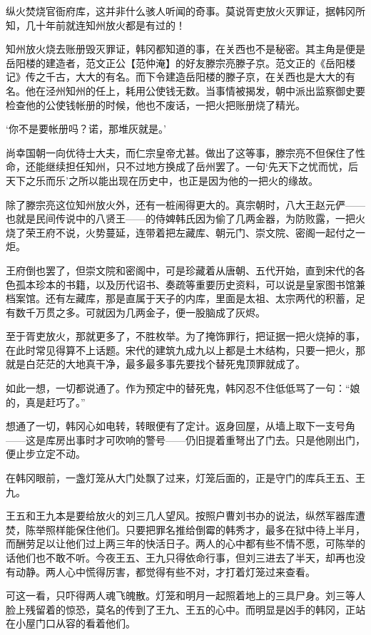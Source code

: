 纵火焚烧官衙府库，这并非什么骇人听闻的奇事。莫说胥吏放火灭罪证，据韩冈所知，几十年前就连知州放火都是有过的！

知州放火烧去账册毁灭罪证，韩冈都知道的事，在关西也不是秘密。其主角是便是岳阳楼的建造者，范文正公【范仲淹】的好友滕宗亮滕子京。范文正的《岳阳楼记》传之千古，大大的有名。而下令建造岳阳楼的滕子京，在关西也是大大的有名。他在泾州知州的任上，耗用公使钱无数。当事情被揭发，朝中派出监察御史要检查他的公使钱帐册的时候，他也不废话，一把火把账册烧了精光。

‘你不是要帐册吗？诺，那堆灰就是。’

尚幸国朝一向优待士大夫，而仁宗皇帝尤甚。做出了这等事，滕宗亮不但保住了性命，还能继续担任知州，只不过地方换成了岳州罢了。一句‘先天下之忧而忧，后天下之乐而乐’之所以能出现在历史中，也正是因为他的一把火的缘故。

除了滕宗亮这位知州放火外，还有一桩闹得更大的。真宗朝时，八大王赵元俨——也就是民间传说中的八贤王——的侍婢韩氏因为偷了几两金器，为防败露，一把火烧了荣王府不说，火势蔓延，连带着把左藏库、朝元门、崇文院、密阁一起付之一炬。

王府倒也罢了，但崇文院和密阁中，可是珍藏着从唐朝、五代开始，直到宋代的各色孤本珍本的书籍，以及历代诏书、奏疏等重要历史资料，可以说是皇家图书馆兼档案馆。还有左藏库，那是直属于天子的内库，里面是太祖、太宗两代的积蓄，足有数千万贯之多。可就因为几两金子，便一股脑成了灰烬。

至于胥吏放火，那就更多了，不胜枚举。为了掩饰罪行，把证据一把火烧掉的事，在此时常见得算不上话题。宋代的建筑九成九以上都是土木结构，只要一把火，那就是白茫茫的大地真干净，最多最多事先要找个替死鬼顶罪就成了。

如此一想，一切都说通了。作为预定中的替死鬼，韩冈忍不住低低骂了一句：“娘的，真是赶巧了。”

想通了一切，韩冈心如电转，转眼便有了定计。返身回屋，从墙上取下一支号角——这是库房出事时才可吹响的警号——仍旧提着重弩出了门去。只是他刚出门，便止步立定不动。

在韩冈眼前，一盏灯笼从大门处飘了过来，灯笼后面的，正是守门的库兵王五、王九。

王五和王九本是要给放火的刘三几人望风。按照户曹刘书办的说法，纵然军器库遭焚，陈举照样能保住他们。只要把罪名推给倒霉的韩秀才，最多在狱中待上半月，而酬劳足以让他们过上两三年的快活日子。两人的心中都有些不情不愿，可陈举的话他们也不敢不听。今夜王五、王九只得依命行事，但刘三进去了半天，却再也没有动静。两人心中慌得厉害，都觉得有些不对，才打着灯笼过来查看。

可这一看，只吓得两人魂飞魄散。灯笼和明月一起照着地上的三具尸身。刘三等人脸上残留着的惊恐，莫名的传到了王九、王五的心中。而明显是凶手的韩冈，正站在小屋门口从容的看着他们。

